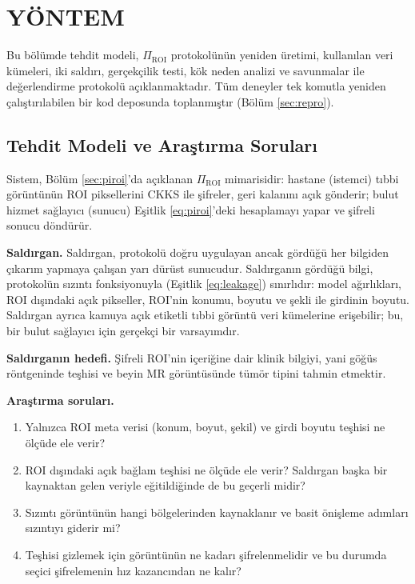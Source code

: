 \chapter{YÖNTEM}\label{CH3}

Bu bölümde tehdit modeli, $\Pi_{\mathrm{ROI}}$ protokolünün yeniden üretimi, kullanılan veri kümeleri, iki saldırı, gerçekçilik testi, kök neden analizi ve savunmalar ile değerlendirme protokolü açıklanmaktadır. Tüm deneyler tek komutla yeniden çalıştırılabilen bir kod deposunda toplanmıştır (Bölüm \ref{sec:repro}).

\section{Tehdit Modeli ve Araştırma Soruları}\label{sec:threat}

Sistem, Bölüm \ref{sec:piroi}'da açıklanan $\Pi_{\mathrm{ROI}}$ mimarisidir: hastane (istemci) tıbbi görüntünün ROI piksellerini CKKS ile şifreler, geri kalanını açık gönderir; bulut hizmet sağlayıcı (sunucu) Eşitlik \ref{eq:piroi}'deki hesaplamayı yapar ve şifreli sonucu döndürür.

\textbf{Saldırgan.} Saldırgan, protokolü doğru uygulayan ancak gördüğü her bilgiden çıkarım yapmaya çalışan yarı dürüst sunucudur. Saldırganın gördüğü bilgi, protokolün sızıntı fonksiyonuyla (Eşitlik \ref{eq:leakage}) sınırlıdır: model ağırlıkları, ROI dışındaki açık pikseller, ROI'nin konumu, boyutu ve şekli ile girdinin boyutu. Saldırgan ayrıca kamuya açık etiketli tıbbi görüntü veri kümelerine erişebilir; bu, bir bulut sağlayıcı için gerçekçi bir varsayımdır.

\textbf{Saldırganın hedefi.} Şifreli ROI'nin içeriğine dair klinik bilgiyi, yani göğüs röntgeninde teşhisi ve beyin MR görüntüsünde tümör tipini tahmin etmektir.

\textbf{Araştırma soruları.}
\begin{enumerate}
\item[\textbf{AS1.}] Yalnızca ROI meta verisi (konum, boyut, şekil) ve girdi boyutu teşhisi ne ölçüde ele verir?
\item[\textbf{AS2.}] ROI dışındaki açık bağlam teşhisi ne ölçüde ele verir? Saldırgan başka bir kaynaktan gelen veriyle eğitildiğinde de bu geçerli midir?
\item[\textbf{AS3.}] Sızıntı görüntünün hangi bölgelerinden kaynaklanır ve basit önişleme adımları sızıntıyı giderir mi?
\item[\textbf{AS4.}] Teşhisi gizlemek için görüntünün ne kadarı şifrelenmelidir ve bu durumda seçici şifrelemenin hız kazancından ne kalır?
\end{enumerate}

